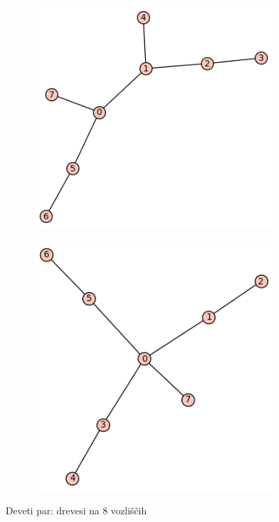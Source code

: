\documentclass[12pt, a4paper]{article}
\begin{document}
\begin{figure}[!htb]
\centering
\begin{subfigure}{0.5\textwidth}
  \centering
  \includegraphics[width=0.5\linewidth]{t-30}
\end{subfigure}%
\begin{subfigure}{0.5\textwidth}
  \centering
  \includegraphics[width=0.5\linewidth]{t-44}
\end{subfigure}
\caption{Deveti par: drevesi na 8 vozliščih}
\label{fig:test}
\end{figure}
\end{document}
